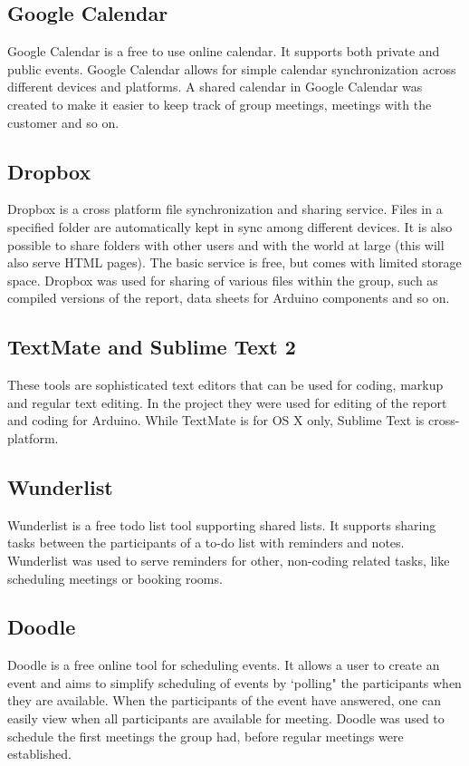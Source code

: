 \subsection{Google Calendar}
Google Calendar is a free to use online calendar. It supports both private and public events. Google Calendar allows for simple calendar synchronization across different devices and platforms. A shared calendar in Google Calendar was created to make it easier to keep track of group meetings, meetings with the customer and so on.

\subsection{Dropbox}
Dropbox is a cross platform file synchronization and sharing service. Files in a specified folder are automatically kept in sync among different devices. It is also possible to share folders with other users and with the world at large (this will also serve HTML pages). The basic service is free, but comes with limited storage space. Dropbox was used for sharing of various files within the group, such as compiled versions of the report, data sheets for Arduino components and so on.

\subsection{TextMate and Sublime Text 2}
These tools are sophisticated text editors that can be used for coding, markup and regular text editing. In the project they were used for editing of the report and coding for Arduino. While TextMate is for OS X only, Sublime Text is cross-platform.

\subsection{Wunderlist}
Wunderlist is a free todo list tool supporting shared lists. It supports sharing tasks between the participants of a to-do list with reminders and notes. Wunderlist was used to serve reminders for other, non-coding related tasks, like scheduling meetings or booking rooms.

\subsection{Doodle}
Doodle is a free online tool for scheduling events. It allows a user to create an event and aims to simplify scheduling of events by `polling" the participants when they are available. When the participants of the event have answered, one can easily view when all participants are available for meeting. Doodle was used to schedule the first meetings the group had, before regular meetings were established.

